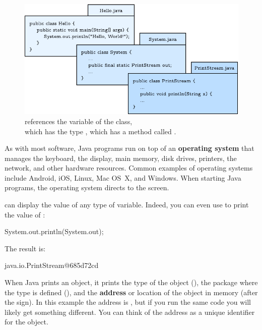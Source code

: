 \begin{figure}[h!]
\includegraphics{system.pdf}
\caption{ references the  variable of the  class,
\\ which has the type , which has a method called .}
\end{figure}


As with most software, Java programs run on top of an {\bf operating system} that manages the keyboard, the display, main memory, disk drives, printers, the network, and other hardware resources.
Common examples of operating systems include Android, iOS, Linux, Mac OS~X, and Windows.
When starting Java programs, the operating system directs  to the screen.

 can display the value of any type of variable. Indeed, you can even use  to print the value of :

\begin{code}
System.out.println(System.out);
\end{code}

The result is:

\begin{stdout}
java.io.PrintStream@685d72cd
\end{stdout}


When Java prints an object, it prints the type of the object (), the package where the type is defined (), and the {\bf address} or location of the object in memory (after the  sign).
In this example the address is , but if you run the same code you will likely get something different.
You can think of the address as a unique identifier for the object.


